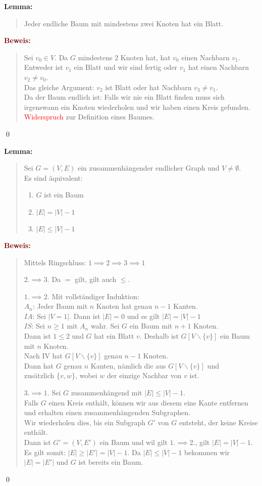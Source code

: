 \documentclass{article}
\newcommand{\red}[1]{\textcolor{red}{#1}}
\newcommand{\dgr}[1]{\textcolor{dgr}{#1}}
\newcommand{\maroon}[1]{\textcolor{maroon}{#1}}
\newcommand{\lem}[1]{\dgr{\textbf{Lemma: }}\begin{quote}#1\end{quote}}
\newcommand{\pr}[1]{\maroon{\textbf{Beweis: }}\begin{quote}#1\end{quote}\qed}
\newcommand{\bs}{\backslash}
\begin{document}
\newpage
\lem{
    Jeder endliche Baum mit mindestens zwei Knoten hat ein Blatt.
}
\pr{
    Sei $v_0 \in V$. Da $G$ mindestens $2$ Knoten hat, hat $v_0$ einen Nachbarn $v_1$. Entweder ist $v_1$ ein Blatt und wir sind fertig oder $v_1$ hat einen Nachbarn $v_2 \ne v_0$.\\
    Das gleiche Argument: $v_2$ ist Blatt oder hat Nachbarn $v_3 \ne v_1$.\\
    Da der Baum endlich ist: Falls wir nie ein Blatt finden muss sich irgenswann ein Knoten wiederholen und wir haben einen Kreis gefunden. \red{Widerspruch} zur Definition eines Baumes.
}

\lem{
    Sei $G=(V,E)$ ein zusammenhängender endlicher Graph und $V \ne \emptyset$.\\
    Es sind äquivalent:
    \begin{enumerate}
        \item $G$ ist ein Baum
        \item $|E| = |V| - 1$
        \item $|E| \le |V| - 1$
    \end{enumerate}
}

\pr{
    Mittels Ringschluss: $1 \implies 2 \implies 3 \implies 1$

    \underline{$2. \implies 3.$} Da $=$ gilt, gilt auch $\le$.

    \underline{$1. \implies 2.$} Mit vollständiger Induktion:\\
    $A_n$: Jeder Baum mit $n$ Knoten hat genau $n-1$ Kanten.\\
    $IA$: Sei $|V=1|$. Dann ist $|E| = 0$ und es gilt $|E| = |V|-1$\\
    $IS$: Sei $n \ge 1$ mit $A_n$ wahr. Sei $G$ ein Baum mit $n+1$ Knoten.\\
    Dann ist $1 \le 2$ und $G$ hat ein Blatt $v$. Deshalb ist $G[V \bs \{v\}]$ ein Baum mit $n$ Knoten.\\
    Nach IV hat $G[V \bs \{v\}]$ genau $n-1$ Knoten.\\
    Dann hat $G$ genau $n$ Kanten, nämlich die aus $G[V \bs \{v\}]$ und\\
    zusätzlich $\{v,w\}$, wobei $w$ der einzige Nachbar von $v$ ist.

    \underline{$3. \implies 1.$} Sei $G$ zusammenhängend mit $|E| \le |V| - 1$.\\
    Falls $G$ einen Kreis enthält, können wir aus diesem eine Kante entfernen und erhalten einen zusammenhängenden Subgraphen.\\
    Wir wiederholen dies, bis ein Subgraph $G'$ von $G$ entsteht, der keine Kreise enthält.\\
    Dann ist $G' = (V,E')$ ein Baum und wil gilt $1. \implies 2.$, gilt $|E| = |V|-1$.\\
    Es gilt somit: $|E| \ge |E'| = |V| - 1$. Da $|E| \le |V|-1$ bekommen wir $|E|=|E'|$ und $G$ ist bereits ein Baum.
}
\end{document}
